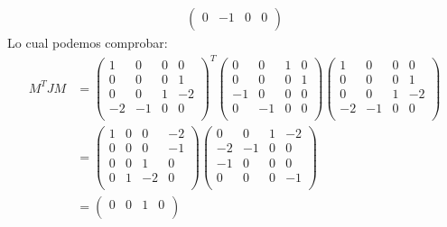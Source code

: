 \documentclass[a4paper]{article}
\begin{document}
\begin{answer}[Punto 19]
\begin{align*}
\begin{pmatrix}
                0 & -1 & 0 & 0\\
            \end{pmatrix}
        \end{align*}
        Lo cual podemos comprobar:
        \begin{align*}
            M^T J M &= \begin{pmatrix}
                1 & 0 & 0 & 0\\
                0 & 0 & 0 & 1\\
                0 & 0 & 1 & -2\\
                -2 & -1 & 0 & 0\\
            \end{pmatrix}^T \begin{pmatrix}
                0 & 0 & 1 & 0\\
                0 & 0 & 0 & 1\\
                -1 & 0 & 0 & 0\\
                0 & -1 & 0 & 0\\
            \end{pmatrix} \begin{pmatrix}
                1 & 0 & 0 & 0\\
                0 & 0 & 0& 1\\
                0 & 0 & 1 & -2\\
                -2 & -1 & 0 & 0\\
            \end{pmatrix} \\
            &= \begin{pmatrix}
                1 & 0 & 0 & -2\\
                0 & 0 & 0 & -1\\
                0 & 0 & 1 & 0\\
                0 & 1 & -2 & 0\\
            \end{pmatrix} \begin{pmatrix}
                0 & 0 & 1 & -2\\
                -2 & -1 & 0 & 0\\
                -1 & 0 & 0 & 0\\
                0 & 0& 0& -1\\
            \end{pmatrix} \\
            &= \begin{pmatrix}
                0 & 0 & 1 & 0\\

\end{pmatrix}
\end{align*}
\end{answer}
\end{document}
